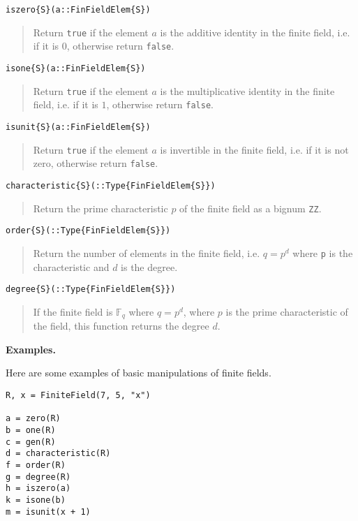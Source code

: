 \documentclass[a4paper,10pt]{article}
\newcommand{\F}{\mathbb{F}}
\newcommand{\code}{\lstinline}
\newcommand{\desc}[1]{\vspace{-3mm}\begin{quote}#1\end{quote}}
\begin{document}
{{{\begin{lstlisting}
iszero{S}(a::FinFieldElem{S})
\end{lstlisting}

\desc{Return \code{true} if the element $a$ is the additive identity in the
finite field, i.e. if it is $0$, otherwise return \code{false}.}

\begin{lstlisting}
isone{S}(a::FinFieldElem{S})
\end{lstlisting}

\desc{Return \code{true} if the element $a$ is the multiplicative identity in
the finite field, i.e. if it is $1$, otherwise return \code{false}.}

\begin{lstlisting}
isunit{S}(a::FinFieldElem{S})
\end{lstlisting}

\desc{Return \code{true} if the element $a$ is invertible in the finite field,
i.e. if it is not zero, otherwise return \code{false}.}

\begin{lstlisting}
characteristic{S}(::Type{FinFieldElem{S}})
\end{lstlisting}

\desc{Return the prime characteristic $p$ of the finite field as a bignum
\code{ZZ}.}

\begin{lstlisting}
order{S}(::Type{FinFieldElem{S}})
\end{lstlisting}

\desc{Return the number of elements in the finite field, i.e. $q = p^d$
where \code{p} is the characteristic and $d$ is the degree.}

\begin{lstlisting}
degree{S}(::Type{FinFieldElem{S}})
\end{lstlisting}

\desc{If the finite field is $\F_q$ where $q = p^d$, where $p$ is the
prime characteristic of the field, this function returns the degree
$d$.}

\textbf{Examples.}

Here are some examples of basic manipulations of finite fields.

\begin{lstlisting}
R, x = FiniteField(7, 5, "x")

a = zero(R)
b = one(R)
c = gen(R)
d = characteristic(R)
f = order(R)
g = degree(R)
h = iszero(a)
k = isone(b)
m = isunit(x + 1)
\end{lstlisting}

}}}
\end{document}

